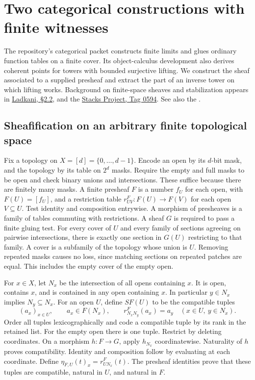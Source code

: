 \section{Two categorical constructions with finite witnesses}
\label{sec:categorycases}

The repository's categorical packet constructs finite limits and glues
ordinary function tables on a finite cover. Its object-calculus development
also derives coherent points for towers with bounded surjective lifting.
We construct the sheaf associated to a supplied presheaf and extract the part of an inverse tower on which lifting works.
Background on finite-space sheaves and stabilization appears in \href{https://arxiv.org/abs/math/0610685}{Ladkani, \S2.2}, and the
\href{https://stacks.math.columbia.edu/tag/0594}{Stacks Project, Tag 0594}. See also the .

\subsection{Sheafification on an arbitrary finite topological space}

Fix a topology on $X=[d]=\{0,\ldots,d-1\}$. Encode an open by its
$d$-bit mask, and the topology by its table on $2^d$ masks.
Require the empty and full masks to be open and check binary unions and
intersections. These suffice because there are finitely many masks.
A finite presheaf $F$ is a number $f_U$ for each open, with
$F(U)=[f_U]$, and a restriction table $r^F_{UV}:F(U)\to F(V)$
for each open $V\subseteq U$. Test identity and composition entrywise.
A morphism of presheaves is a family of tables commuting with restrictions.
A sheaf $G$ is required to pass a finite gluing test. For every cover of $U$
and every family of sections agreeing on pairwise intersections, there is
exactly one section in $G(U)$ restricting to that family. A cover is
a subfamily of the topology whose union is $U$. Removing repeated masks
causes no loss, since matching sections on repeated patches are equal.
This includes the empty cover of the empty open.

For $x\in X$, let $N_x$ be the intersection of all opens containing $x$.
It is open, contains $x$, and is contained in any open containing $x$.
In particular $y\in N_x$ implies $N_y\subseteq N_x$.
For an open $U$, define $SF(U)$ to be the compatible tuples
\[
 (a_x)_{x\in U},\qquad a_x\in F(N_x),\qquad
 r^F_{N_xN_y}(a_x)=a_y\quad(x\in U,\ y\in N_x).
\]
Order all tuples lexicographically and code a compatible tuple by its rank
in the retained list. For the empty open there is one tuple.
Restrict by deleting coordinates. On a morphism $h:F\to G$, apply
$h_{N_x}$ coordinatewise. Naturality of $h$ proves compatibility.
Identity and composition follow by evaluating at each coordinate. Define
$\eta_{F,U}(t)_x=r^F_{UN_x}(t)$. The presheaf identities prove that these
tuples are compatible, natural in $U$, and natural in $F$.

